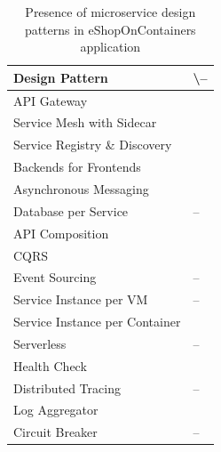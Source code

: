 \documentclass[11pt,a4paper,twocolumn]{article}
\newcommand{\cmark}{\ding{51}}%
\begin{document}
\begin{table}[H]
\centering 
    \begin{tabular}{ 
  | >{\centering\arraybackslash} m{15.5em} 
  | >{\centering\arraybackslash} m{2.2em} | }
    \hline
    \rowcolor{bluepoli!40}
    \textbf{Design Pattern} & \cmark \textbackslash – \T\B \\
    \hline \hline
    API Gateway & \cmark \T\B\\
    \hline
    \rowcolor{bluepoli!10}
    Service Mesh with Sidecar & \cmark \T\B \\
    \hline
    Service Registry \& Discovery & \cmark \T\B \\
    \hline
    \rowcolor{bluepoli!10}
    Backends for Frontends & \cmark \T\B \\
    \hline
    Asynchronous Messaging & \cmark \T\B \\
    \hline
    \rowcolor{bluepoli!10}
    Database per Service & – \T\B \\
    \hline
    API Composition & \cmark \T\B \\
    \hline
    \rowcolor{bluepoli!10}
    CQRS & \cmark \T\B \\
    \hline
    Event Sourcing & – \T\B \\
    \hline
    \rowcolor{bluepoli!10}
    Service Instance per VM & – \T\B \\
    \hline
    Service Instance per Container & \cmark \T\B \\
    \hline
    \rowcolor{bluepoli!10}
    Serverless & – \T\B \\
    \hline
    Health Check & \cmark \T\B \\
    \hline
    \rowcolor{bluepoli!10}
    Distributed Tracing & – \T\B \\
    \hline
    Log Aggregator & \cmark\T\B \\
    \hline
    \rowcolor{bluepoli!10}
    Circuit Breaker & – \T\B \\
    \hline
    \end{tabular}
    \\[10pt]
    \caption{Presence of microservice design patterns in eShopOnContainers application}
    \label{table:eshop_1}
\end{table}
\end{document}
